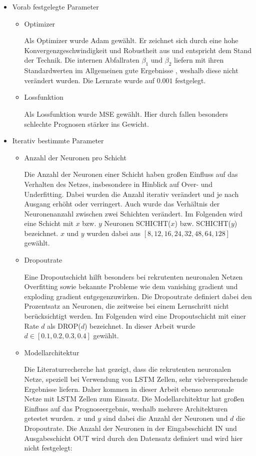 \documentclass[
12pt, %
toc=listofnumbered, %
toc=chapterentrydotfill, %
numbers=noenddot, %
captions=tableheading, %
bibliography=numbered
]{scrreprt}
\newcommand{\qm}[1]{\glqq#1\grqq{}} %
\begin{document}
\begin{itemize}
	\item Vorab festgelegte Parameter
	\begin{itemize}
		\item Optimizer
		
		Als Optimizer wurde Adam gewählt. Er zeichnet sich durch eine hohe Konvergenzgeschwindigkeit und Robustheit aus und entspricht dem Stand der Technik. Die internen Abfallraten $\beta_1$ und $\beta_2$ liefern mit ihren Standardwerten im Allgemeinen gute Ergebnisse \cite{2017_Kingma_AdamMethodStochastic}, weshalb diese nicht verändert wurden. Die Lernrate wurde auf $0.001$ festgelegt.

		\item Lossfunktion
		
		Als Lossfunktion wurde MSE gewählt. Hier durch fallen besonders schlechte Prognosen stärker ins Gewicht.

	\end{itemize}

	\item Iterativ bestimmte Parameter
	\begin{itemize}
		\item Anzahl der Neuronen pro Schicht
		
		Die Anzahl der Neuronen einer Schicht haben großen Einfluss auf das Verhalten des Netzes, insbesondere in Hinblick auf Over- und Underfitting. Dabei wurden die Anzahl iterativ verändert und je nach Ausgang erhöht oder verringert. Auch wurde das Verhältnis der Neuronenanzahl zwischen zwei Schichten verändert. Im Folgenden wird eine Schicht mit $x$ bzw. $y$ Neuronen SCHICHT($x$) bzw. SCHICHT($y$) bezeichnet. $x$ und $y$ wurden dabei aus $[8,12,16,24,32,48,64,128]$ gewählt.

		\item Dropoutrate
		
		Eine Dropoutschicht hilft besonders bei rekrutenten neuronalen Netzen Overfitting sowie bekannte Probleme wie dem \qm{vanishing gradient} und \qm{exploding gradient} entgegenzuwirken. Die Dropoutrate definiert dabei den Prozentsatz an Neuronen, die zeitweise bei einem Lernschritt nicht berücksichtigt werden. Im Folgenden wird eine Dropoutschicht mit einer Rate $d$ als DROP($d$) bezeichnet. In dieser Arbeit wurde $d \in [0.1, 0.2, 0.3, 0.4]$ gewählt.
		\item Modellarchitektur
		
		Die Literaturrecherche hat gezeigt, dass die rekrutenten neuronalen Netze, speziell bei Verwendung von LSTM Zellen, sehr vielversprechende Ergebnisse liefern. Daher kommen in dieser Arbeit ebenso neuronale Netze mit LSTM Zellen zum Einsatz. Die Modellarchitektur hat großen Einfluss auf das Prognoseergebnis, weshalb mehrere Architekturen getestet wurden. $x$ und $y$ sind dabei die Anzahl der Neuronen und $d$ die Dropoutrate. Die Anzahl der Neuronen in der Eingabeschicht IN und Ausgabeschicht OUT wird durch den Datensatz definiert und wird hier nicht festgelegt:


\end{itemize}
\end{itemize}
\end{document}
